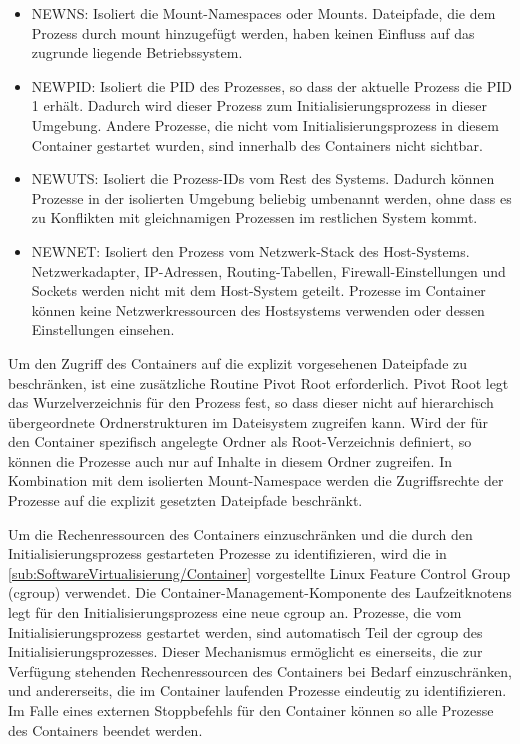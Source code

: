 \begin{itemize}
    \item NEWNS: Isoliert die Mount-Namespaces oder Mounts. Dateipfade, die dem Prozess durch mount hinzugefügt werden, haben keinen Einfluss auf das zugrunde liegende Betriebssystem.
    \item NEWPID: Isoliert die \gls{PID} des Prozesses, so dass der aktuelle Prozess die \gls{PID} 1 erhält. Dadurch wird dieser Prozess zum Initialisierungsprozess in dieser Umgebung. Andere Prozesse, die nicht vom Initialisierungsprozess in diesem Container gestartet wurden, sind innerhalb des Containers nicht sichtbar.
    \item NEWUTS: Isoliert die Prozess-IDs vom Rest des Systems. Dadurch können Prozesse in der isolierten Umgebung beliebig umbenannt werden, ohne dass es zu Konflikten mit gleichnamigen Prozessen im restlichen System kommt.
    \item NEWNET: Isoliert den Prozess vom Netzwerk-Stack des Host-Systems. Netzwerkadapter, IP-Adressen, Routing-Tabellen, Firewall-Einstellungen und Sockets werden nicht mit dem Host-System geteilt. Prozesse im Container können keine Netzwerkressourcen des Hostsystems verwenden oder dessen Einstellungen einsehen.
\end{itemize}

Um den Zugriff des Containers auf die explizit vorgesehenen Dateipfade zu beschränken, ist eine zusätzliche Routine Pivot Root erforderlich. Pivot Root legt das Wurzelverzeichnis für den Prozess fest, so dass dieser nicht auf hierarchisch übergeordnete Ordnerstrukturen im Dateisystem zugreifen kann. Wird der für den Container spezifisch angelegte Ordner als Root-Verzeichnis definiert, so können die Prozesse auch nur auf Inhalte in diesem Ordner zugreifen. In Kombination mit dem isolierten Mount-Namespace werden die Zugriffsrechte der Prozesse auf die explizit gesetzten Dateipfade beschränkt.

Um die Rechenressourcen des Containers einzuschränken und die durch den Initialisierungsprozess gestarteten Prozesse zu identifizieren, wird die in \autoref{sub:SoftwareVirtualisierung/Container} vorgestellte Linux Feature Control Group (cgroup) verwendet. Die Container-Management-Komponente des Laufzeitknotens legt für den Initialisierungsprozess eine neue cgroup an. Prozesse, die vom Initialisierungsprozess gestartet werden, sind automatisch Teil der cgroup des Initialisierungsprozesses. Dieser Mechanismus ermöglicht es einerseits, die zur Verfügung stehenden Rechenressourcen des Containers bei Bedarf einzuschränken, und andererseits, die im Container laufenden Prozesse eindeutig zu identifizieren. Im Falle eines externen Stoppbefehls für den Container können so alle Prozesse des Containers beendet werden.

